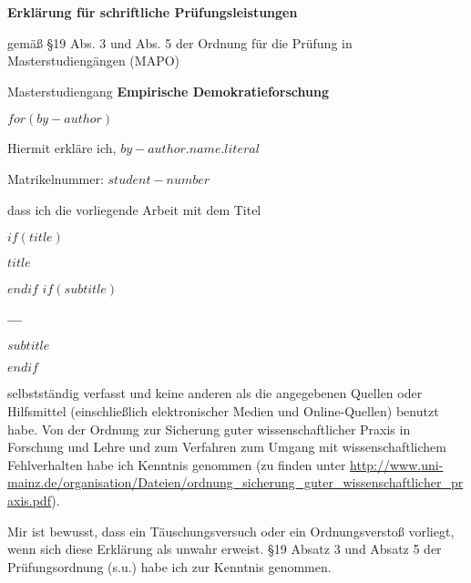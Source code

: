 \newcommand*\wildcard[2][7.5cm]{\vspace*{2cm}\parbox{#1}{\hrulefill\par#2}}
\cleardoublepage
\thispagestyle{empty}
{\sffamily
    \begin{center}
        {\LARGE\bfseries Erklärung für schriftliche Prüfungsleistungen \par}
        {\normalsize gemäß §19 Abs. 3 und Abs. 5 der Ordnung für die Prüfung in Masterstudiengängen (MAPO) \par}
        \vspace{.5em}
    \end{center}
    {\normalsize Masterstudiengang \bfseries Empirische Demokratieforschung \par}
    \vspace{.5em}
    $for(by-author)$
    {\normalsize Hiermit erkläre ich, \bfseries $by-author.name.literal$ \par}
    {\normalsize Matrikelnummer: \bfseries $student-number$ \par}
    {\normalsize dass ich die vorliegende Arbeit mit dem Titel \par}
    \begin{center}
        $if(title)$
        {\Large\bfseries $title$ \par}
        $endif$
        $if(subtitle)$
        {\large\bfseries --- \par}
        {\large\bfseries $subtitle$ \par}
        $endif$
        \vspace{1em}
    \end{center}
    {\fontsize{12}{12}\raggedright selbstständig verfasst und keine anderen als die angegebenen Quellen oder Hilfsmittel (einschließlich elektronischer Medien und Online-Quellen) benutzt habe. Von der Ordnung zur Sicherung guter wissenschaftlicher Praxis in Forschung und Lehre und zum Verfahren zum Umgang mit wissenschaftlichem Fehlverhalten habe ich Kenntnis genommen (zu finden unter \url{http://www.uni-mainz.de/organisation/Dateien/ordnung_sicherung_guter_wissenschaftlicher_praxis.pdf}). \par}
    \vspace{1em}
    {\fontsize{12}{12}\raggedright Mir ist bewusst, dass ein Täuschungsversuch oder ein Ordnungsverstoß vorliegt, wenn sich diese Erklärung als unwahr erweist. §19 Absatz 3 und Absatz 5 der Prüfungsordnung (s.u.) habe ich zur Kenntnis genommen. \par}
}
